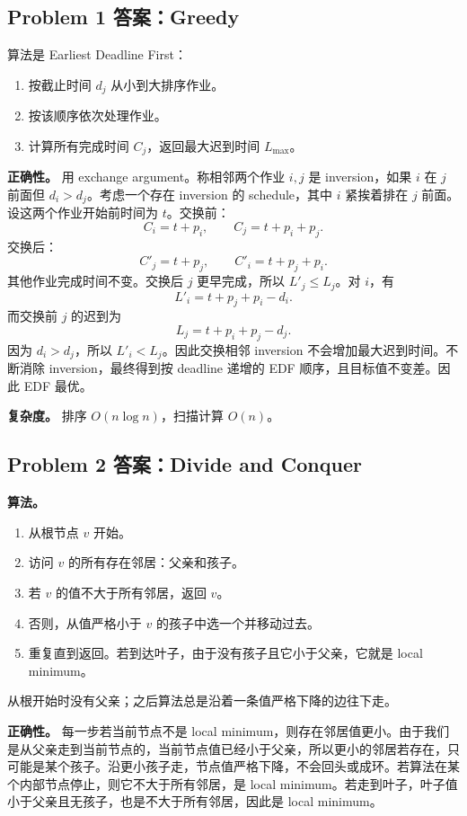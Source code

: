 \documentclass[UTF8,a4paper,11pt]{ctexart}
\begin{document}
\subsection*{Problem 1 答案：Greedy}

算法是 Earliest Deadline First：
\begin{enumerate}
  \item 按截止时间 $d_j$ 从小到大排序作业。
  \item 按该顺序依次处理作业。
  \item 计算所有完成时间 $C_j$，返回最大迟到时间 $L_{\max}$。
\end{enumerate}

\textbf{正确性。} 用 exchange argument。称相邻两个作业 $i,j$ 是 inversion，如果 $i$ 在 $j$ 前面但 $d_i>d_j$。考虑一个存在 inversion 的 schedule，其中 $i$ 紧挨着排在 $j$ 前面。设这两个作业开始前时间为 $t$。交换前：
\[
C_i=t+p_i,\qquad C_j=t+p_i+p_j.
\]
交换后：
\[
C'_j=t+p_j,\qquad C'_i=t+p_j+p_i.
\]
其他作业完成时间不变。交换后 $j$ 更早完成，所以 $L'_j\le L_j$。对 $i$，有
\[
L'_i=t+p_j+p_i-d_i.
\]
而交换前 $j$ 的迟到为
\[
L_j=t+p_i+p_j-d_j.
\]
因为 $d_i>d_j$，所以 $L'_i<L_j$。因此交换相邻 inversion 不会增加最大迟到时间。不断消除 inversion，最终得到按 deadline 递增的 EDF 顺序，且目标值不变差。因此 EDF 最优。

\textbf{复杂度。} 排序 $O(n\log n)$，扫描计算 $O(n)$。

\subsection*{Problem 2 答案：Divide and Conquer}

\textbf{算法。}
\begin{enumerate}
  \item 从根节点 $v$ 开始。
  \item 访问 $v$ 的所有存在邻居：父亲和孩子。
  \item 若 $v$ 的值不大于所有邻居，返回 $v$。
  \item 否则，从值严格小于 $v$ 的孩子中选一个并移动过去。
  \item 重复直到返回。若到达叶子，由于没有孩子且它小于父亲，它就是 local minimum。
\end{enumerate}

从根开始时没有父亲；之后算法总是沿着一条值严格下降的边往下走。

\textbf{正确性。} 每一步若当前节点不是 local minimum，则存在邻居值更小。由于我们是从父亲走到当前节点的，当前节点值已经小于父亲，所以更小的邻居若存在，只可能是某个孩子。沿更小孩子走，节点值严格下降，不会回头或成环。若算法在某个内部节点停止，则它不大于所有邻居，是 local minimum。若走到叶子，叶子值小于父亲且无孩子，也是不大于所有邻居，因此是 local minimum。
\end{document}
